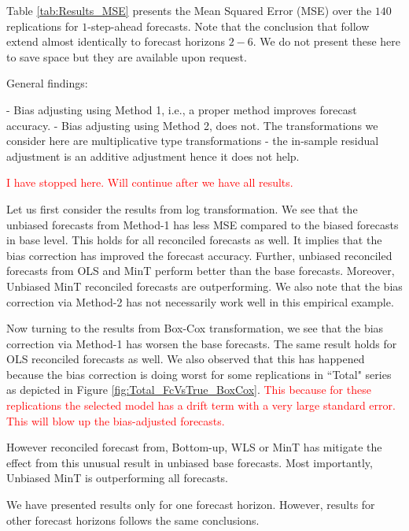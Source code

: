 \documentclass[12pt]{article}
\theoremstyle{definition}
\theoremstyle{property}
\begin{document}
Table \ref{tab:Results_MSE} presents the Mean Squared Error (MSE) over the $140$ replications for $1$-step-ahead forecasts. Note that the conclusion that follow extend almost identically to forecast horizons $2-6$. We do not present these here to save space but they are available upon request.

General findings:

- Bias adjusting using Method 1, i.e., a proper method improves forecast accuracy.
- Bias adjusting using Method 2, does not. The transformations we consider here are multiplicative type transformations - the in-sample residual adjustment is an additive adjustment hence it does not help.

\textcolor{red}{I have stopped here. Will continue after we have all results.}

Let us first consider the results from log transformation. We see that the unbiased forecasts from Method-1 has less MSE compared to the biased forecasts in base level. This holds for all reconciled forecasts as well. It implies that the bias correction has improved the forecast accuracy. Further, unbiased reconciled forecasts from OLS and MinT perform better than the base forecasts. Moreover, Unbiased MinT reconciled forecasts are outperforming.
We also note that the bias correction via Method-2 has not necessarily work well in this empirical example.

Now turning to the results from Box-Cox transformation, we see that the bias correction via Method-1 has worsen the base forecasts. The same result holds for OLS reconciled forecasts as well. We also observed that this has happened because the bias correction is doing worst for some replications in ``Total" series as depicted in Figure \ref{fig:Total_FcVsTrue_BoxCox}. \textcolor{red}{This because for these replications the selected model has a drift term with a very large standard error. This will blow up the bias-adjusted forecasts.}

However reconciled forecast from, Bottom-up, WLS or MinT has mitigate the effect from this unusual result in unbiased base forecasts. Most importantly, Unbiased MinT is outperforming all forecasts.

We have presented results only for one forecast horizon. However, results for other forecast horizons follows the same conclusions.
\end{document}
